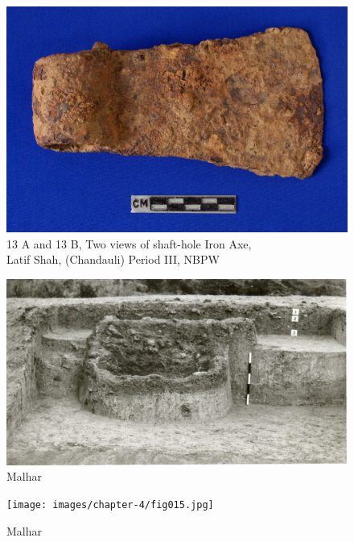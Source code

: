 \begin{figure}[H]
\renewcommand{\thefigure}{13B}
\includegraphics[scale=0.75]{images/chapter-4/fig013B.jpg}
\caption{13 A and 13 B, Two views of shaft-hole Iron Axe,\\ Latif Shah, (Chandauli) Period III, NBPW}\label{chapter-4-fig13B}
\end{figure}

\newpage

\begin{figure}[H]
\setcounter{figure}{13}
\includegraphics[scale=0.6]{images/chapter-4/fig014.jpg}
\caption{Malhar}\label{chapter-4-fig14}
\vspace{-.5cm}
\end{figure}


\begin{figure}[H]
\texttt{[image: images/chapter-4/fig015.jpg]}
\caption{Malhar}\label{chapter-4-fig15}
\vspace{-.5cm}
\end{figure}

